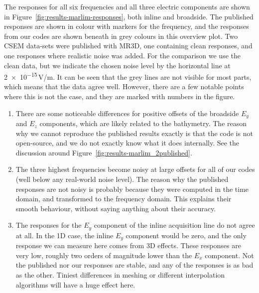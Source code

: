 \documentclass[
    paper,
  ]{geophysics}
\begin{document}
%
%

The responses for all six frequencies and all three electric components are shown in Figure~\ref{fig:results-marlim-responses}, both inline and broadside. The published responses are shown in colour with markers for the frequency, and the responses from our codes are shown beneath in grey colours in this overview plot.
%
%
Two CSEM data-sets were published with MR3D, one containing clean responses, and one responses where realistic noise was added. For the comparison we use the clean data, but we indicate the chosen noise level by the horizontal line at \num{2e-15}\,V/m. It can be seen that the grey lines are not visible for most parts, which means that the data agree well. However, there are a few notable points where this is not the case, and they are marked with numbers in the figure.
\begin{enumerate}
  \item There are some noticeable differences for positive offsets of the broadside $E_y$ and $E_z$ components, which are likely related to the bathymetry. The reason why we cannot reproduce the published results exactly is that the code is not open-source, and we do not exactly know what it does internally. See the discussion around Figure~\ref{fig:results-marlim_2published}.
  \item The three highest frequencies become noisy at large offsets for all of our codes (well below any real-world noise level). The reason why the published responses are not noisy is probably because they were computed in the time domain, and transformed to the frequency domain. This explains their smooth behaviour, without saying anything about their accuracy.
  \item The responses for the $E_y$ component of the inline acquisition line do not agree at all. In the 1D case, the inline $E_y$ component would be zero, and the only response we can measure here comes from 3D effects. These responses are very low, roughly two orders of magnitude lower than the $E_x$ component. Not the published nor our responses are stable, and any of the responses is as bad as the other. Tiniest differences in meshing or different interpolation algorithms will have a huge effect here.
\end{enumerate}
\end{document}
